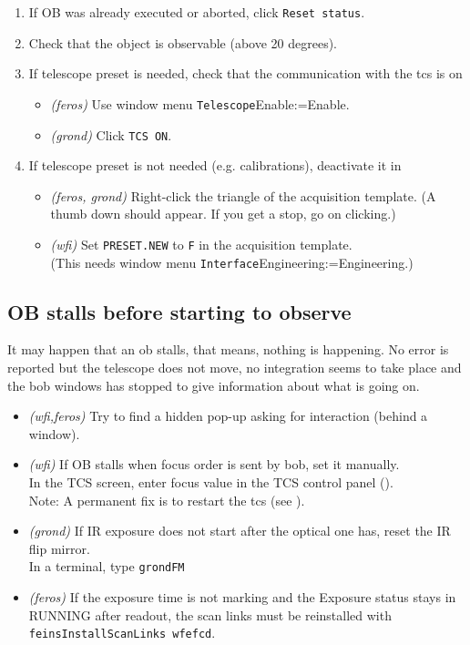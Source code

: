 \documentclass[11pt,fleqn,a4paper]{book}
\makeatletter
\def\menu#1#2{\texttt{#1}\ifx{}#2\else\@for\@x:=#2\do{$\rightarrow$\texttt{\@x}}\fi}
\def\wmenu#1#2{window menu \menu{#1}{#2}}
\makeatother
\begin{document}
\begin{enumerate}
  \item If OB was already executed or aborted, click \texttt{Reset status}. 
  \item Check that the object is observable (above 20 degrees).
  \item If telescope preset is needed, check that the communication with the \gls{tcs} is on
    \begin{itemize}
       \item \textit{(\gls{feros})} Use \wmenu{Telescope}{Enable}.
       \item \textit{(\gls{grond})} Click \texttt{TCS ON}.
    \end{itemize}
  \item If telescope preset is not needed (e.g. calibrations), deactivate it in 
    \begin{itemize}
      \item \textit{(\gls{feros}, \gls{grond})} Right-click the triangle of the \gls{acquisition} \gls{template}.
                   (A thumb down should appear.  If you get a stop, go on clicking.)
      \item \textit{(\gls{wfi})} Set \texttt{PRESET.NEW} to \texttt{F} in the \gls{acquisition} \gls{template}.\\
         (This needs \wmenu{Interface}{Engineering}.) 
    \end{itemize}
\end{enumerate}

\subsection{OB stalls before starting to observe}

It may happen that an \gls{ob} \gls{stall}s, that means, nothing is happening.  No error is reported but the telescope does not move, no integration seems to take place and the \gls{bob} windows has stopped to give information about what is going on.

\begin{itemize}
\item \textit{(\gls{wfi},\gls{feros})} Try to find a hidden pop-up asking for interaction (behind a window).
\item \textit{(\gls{wfi})} If OB stalls when \gls{focus} order is sent by \gls{bob},
set it manually.\\
In the TCS screen, enter \gls{focus} value in the \gls{TCS control panel} ().\\
Note: A permanent fix is to restart the \gls{tcs} (see ).
\item \textit{(\gls{grond})} If IR exposure does not start after the optical one has, reset the IR \gls{flip mirror}.\\
In a terminal, type \texttt{\gls{grondFM}}
\item \textit{(\gls{feros})} If the exposure time is not marking and the Exposure status stays in RUNNING after readout, the scan links must be reinstalled with \texttt{feinsInstallScanLinks wfefcd}.
\end{itemize}
\end{document}
